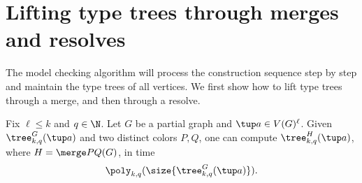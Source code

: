 \section{Lifting type trees through merges and resolves}
\label{sec:merge-resolve}
The model checking algorithm will process
the construction sequence step by step and maintain the type trees of all vertices.
We first show how to lift type trees through a merge, and then through a resolve.

\begin{lemma}\label{lem:merge-lift}
Fix $\ell\le k$ and $q\in\N$.
Let $G$ be a partial graph and $\tup a\in V(G)^\ell$.
Given
$\tree^G_{k,q}(\tup a)$ and two distinct colors $P,Q$, one can compute
 $\tree^{H}_{k,q}(\tup a)$, where $H=\merge PQ(G)$,
in time
\[
\poly_{k,q}(\size{\tree^G_{k,q}(\tup a)}).
\]
\end{lemma}
